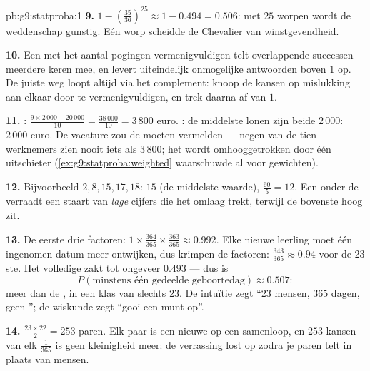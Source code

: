 \begin{solution}{pb:g9:statproba:1}
\textbf{9.} $1 - \left(\frac{35}{36}\right)^{25} \approx 1 - 0.494 = 0.506$: met
$25$ worpen wordt de weddenschap gunstig. Eén worp scheidde de Chevalier van
winstgevendheid.

\textbf{10.} Een  met het aantal pogingen vermenigvuldigen telt overlappende
successen meerdere keren mee, en levert uiteindelijk onmogelijke antwoorden boven
$1$ op. De juiste weg loopt altijd via het complement: knoop de kansen op mislukking
aan elkaar door te vermenigvuldigen, en trek daarna af van $1$.

\textbf{11.} : $\frac{9 \times 2\,000 + 20\,000}{10} =
\frac{38\,000}{10} = 3\,800$ euro. : de middelste lonen zijn beide
$2\,000$:  $2\,000$ euro. De vacature zou de  moeten vermelden ---
negen van de tien werknemers zien nooit iets als $3\,800$; het  wordt
omhooggetrokken door één uitschieter (\cref{ex:g9:statproba:weighted} waarschuwde
al voor gewichten).

\textbf{12.} Bijvoorbeeld $2, 8, 15, 17, 18$:  $15$ (de middelste waarde),
 $\frac{60}{5} = 12$. Een  onder de  verraadt een staart
van \emph{lage} cijfers die het  omlaag trekt, terwijl de bovenste 
hoog zit.

\textbf{13.} De eerste drie factoren:
$1 \times \frac{364}{365} \times \frac{363}{365} \approx 0.992$. Elke nieuwe
leerling moet één ingenomen datum meer ontwijken, dus krimpen de factoren:
$\frac{343}{365} \approx 0.94$ voor de $23$ste. Het volledige  zakt tot
ongeveer $0.493$ --- dus is
\[
P(\text{minstens één gedeelde geboortedag}) \approx 0.507 :
\]
meer dan de , in een klas van slechts $23$. De intuïtie zegt ``$23$ mensen,
$365$ dagen, geen ''; de wiskunde zegt ``gooi een munt op''.

\textbf{14.} $\frac{23 \times 22}{2} = 253$ paren. Elk paar is een nieuwe  op
een samenloop, en $253$ kansen van elk $\frac{1}{365}$ is geen kleinigheid meer: de
verrassing lost op zodra je paren telt in plaats van mensen.


\end{solution}
